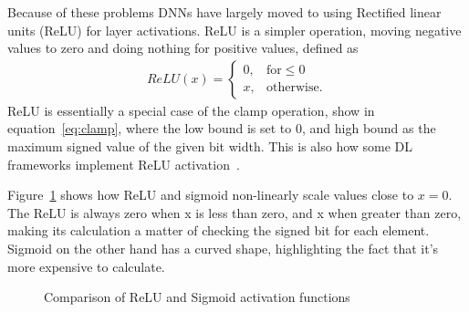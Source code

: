 \documentclass[12pt,a4paper,english
]{tunithesis}
\begin{document}
Because of these problems DNNs have largely moved to using Rectified linear units (ReLU) for layer activations.
ReLU is a simpler operation, moving negative values to zero and doing nothing for positive values, defined as
\begin{align}
ReLU(x) =
\begin{cases}
0, & \text{for} \leq 0 \\
  x, &  \text{otherwise}.
\end{cases}
\end{align}
ReLU is essentially a special case of the clamp operation, show in equation~\ref{eq:clamp}, where the low bound is set to 0, and high bound as the maximum signed value of the given bit width. This is also how some DL frameworks implement ReLU activation~\cite{TVM}.

Figure~\ref{fig:activation-functions} shows how ReLU and sigmoid non-linearly scale values close to $x=0$. The ReLU is always zero when x is less than zero, and x when greater than zero, making its calculation a matter of checking the signed bit for each element. Sigmoid on the other hand has a curved shape, highlighting the fact that it's more expensive to calculate.

\begin{figure}[ht]
\centering
\begin{minipage}[t]{.45\textwidth}
  \centering
\end{minipage}
\begin{minipage}[t]{.45\textwidth}
  \centering
\end{minipage}
\caption{Comparison of ReLU and Sigmoid activation functions}
\label{fig:activation-functions}
\end{figure}
\end{document}
